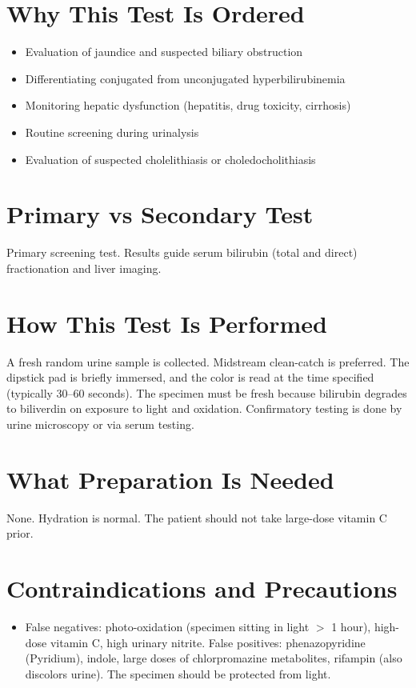 \section*{Why This Test Is Ordered}
\begin{itemize}
  \item Evaluation of jaundice and suspected biliary obstruction
  \item Differentiating conjugated from unconjugated hyperbilirubinemia
  \item Monitoring hepatic dysfunction (hepatitis, drug toxicity, cirrhosis)
  \item Routine screening during urinalysis
  \item Evaluation of suspected cholelithiasis or choledocholithiasis
\end{itemize}

\section*{Primary vs Secondary Test}
Primary screening test. Results guide serum bilirubin (total and direct) fractionation and liver imaging.

\section*{How This Test Is Performed}
A fresh random urine sample is collected. Midstream clean-catch is preferred. The dipstick pad is briefly immersed, and the color is read at the time specified (typically 30--60 seconds). The specimen must be fresh because bilirubin degrades to biliverdin on exposure to light and oxidation. Confirmatory testing is done by urine microscopy or via serum testing.

\section*{What Preparation Is Needed}
None. Hydration is normal. The patient should not take large-dose vitamin C prior.

\section*{Contraindications and Precautions}
\begin{itemize}
  \item False negatives: photo-oxidation (specimen sitting in light $>$ 1 hour), high-dose vitamin C, high urinary nitrite. False positives: phenazopyridine (Pyridium), indole, large doses of chlorpromazine metabolites, rifampin (also discolors urine). The specimen should be protected from light.
\end{itemize}
